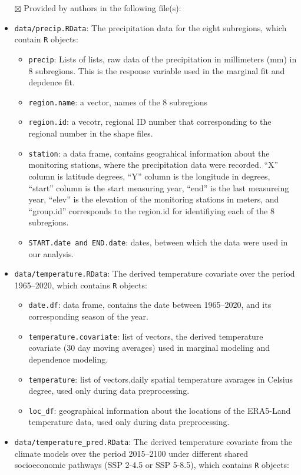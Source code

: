 \documentclass[
]{article}
\providecommand{\tightlist}{%
  \setlength{\itemsep}{0pt}\setlength{\parskip}{0pt}}
\begin{document}
\begin{itemize}
\tightlist
\item[$\boxtimes$]
  Provided by authors in the following file(s):
\item
  \texttt{data/precip.RData}: The precipitation data for the eight
  subregions, which contain \texttt{R} objects:

  \begin{itemize}
  \tightlist
  \item
    \texttt{precip}: Lists of lists, raw data of the precipitation in
    millimeters (mm) in 8 subregions. This is the response variable used
    in the marginal fit and depdence fit.
  \item
    \texttt{region.name}: a vector, names of the 8 subregions
  \item
    \texttt{region.id}: a vecotr, regional ID number that corresponding
    to the regional number in the shape files.
  \item
    \texttt{station}: a data frame, contains geograhical information
    about the monitoring stations, where the precipitation data were
    recorded. ``X'' column is latitude degrees, ``Y'' column is the
    longitude in degrees, ``start'' column is the start measuring year,
    ``end'' is the last measureing year, ``elev'' is the elevation of
    the monitoring stations in meters, and ``group.id'' corresponds to
    the region.id for identifiying each of the 8 subregions.\\
  \item
    \texttt{START.date\ and\ END.date}: dates, between which the data
    were used in our analysis.
  \end{itemize}
\item
  \texttt{data/temperature.RData}: The derived temperature covariate
  over the period 1965--2020, which contains \texttt{R} objects:

  \begin{itemize}
  \tightlist
  \item
    \texttt{date.df}: data frame, contains the date between 1965--2020,
    and its corresponding season of the year.
  \item
    \texttt{temperature.covariate}: list of vectors, the derived
    temperature covariate (30 day moving averages) used in marginal
    modeling and dependence modeling.
  \item
    \texttt{temperature}: list of vectors,daily spatial temperature
    avarages in Celsius degree, used only during data preprocessing.
  \item
    \texttt{loc\_df}: geographical information about the locations of
    the ERA5-Land temperature data, used only during data preprocessing.
  \end{itemize}
\item
  \texttt{data/temperature\_pred.RData}: The derived temperature
  covariate from the climate models over the period 2015--2100 under
  different shared socioeconomic pathways (SSP 2-4.5 or SSP 5-8.5),
  which contains \texttt{R} objects:


\end{itemize}
\end{document}
